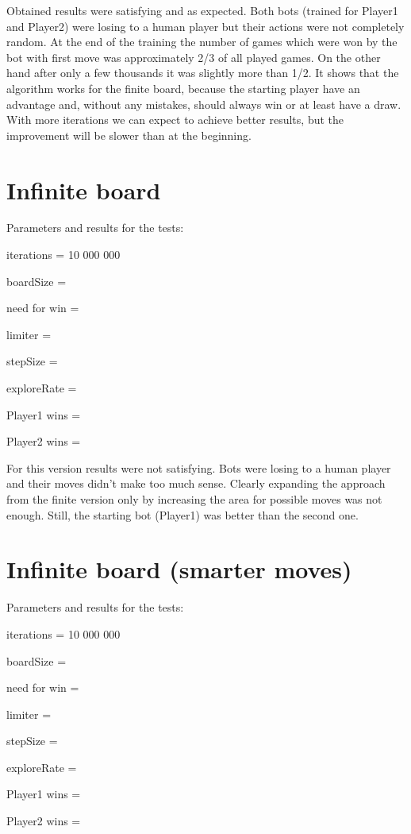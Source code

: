 \documentclass[a4paper,12pt]{book}
\begin{document}
Obtained results were satisfying and as expected. Both bots (trained for Player1 and Player2) were losing to a human player but their actions were not completely random. At the end of the training the number of games which were won by the bot with first move was approximately 2/3 of all played games. On the other hand after only a few thousands it was slightly more than 1/2. It shows that the algorithm works for the finite board, because the starting player have an advantage and, without any mistakes, should always win or at least have a draw. With more iterations we can expect to achieve better results, but the improvement will be slower than at the beginning.

 	\section{Infinite board}

Parameters and results for the tests:

\begin{description}
	\item iterations = 10 000 000
	\item boardSize = 
	\item need for win = 
	\item limiter = 
	\item stepSize = 
	\item exploreRate = 
	\item Player1 wins = 
	\item Player2 wins = 
\end{description}

For this version results were not satisfying. Bots were losing to a human player and their moves didn't make too much sense. Clearly expanding the approach from the finite version only by increasing the area for possible moves was not enough. Still, the starting bot (Player1) was better than the second one.

 	\section{Infinite board (smarter moves)}

Parameters and results for the tests:

\begin{description}
	\item iterations = 10 000 000
	\item boardSize = 
	\item need for win = 
	\item limiter = 
	\item stepSize = 
	\item exploreRate = 
	\item Player1 wins = 
	\item Player2 wins = 
\end{description}
\end{document}

